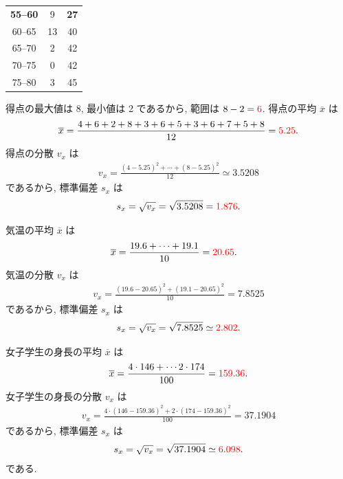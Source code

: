 \begin{qenumerate}
{\begin{table}[H]
\begin{tabular}{c|c|c}
				\textbf{55--60} &  9 & \textbf{27} \\
				60--65 & 13 & 40 \\
				65--70 &  2 & 42 \\
				70--75 &  0 & 42 \\
				75--80 &  3 & 45 \\ \hline
			\end{tabular}
		\end{table}
	}
	\item{
		得点の最大値は 8, 最小値は 2 であるから, 範囲は $8 - 2 = \textcolor{red}{6}$.
		得点の平均 $\overline{x}$ は
		\begin{align}
			\overline{x} = \frac{4 + 6 + 2 + 8 + 3 + 6 + 5 + 3 + 6 + 7 + 5 + 8}{12} = \textcolor{red}{5.25}.
		\end{align}
		得点の分散 $v_{x}$ は
		\begin{align}
			v_{x} = \frac{(4 - 5.25)^{2} + \cdots + (8 - 5.25)^{2}}{12} \simeq 3.5208
		\end{align}
		であるから, 標準偏差 $s_{x}$ は
		\begin{align}
			s_{x} = \sqrt{v_{x}} = \sqrt{3.5208} = \textcolor{red}{1.876}.
		\end{align}
	}
	\item{
		気温の平均 $\overline{x}$ は
		\begin{align}
			\overline{x} &= \frac{19.6 + \cdots + 19.1}{10} = \textcolor{red}{20.65}.
		\end{align}
		気温の分散 $v_{x}$ は
		\begin{align}
			v_{x} = \frac{(19.6 - 20.65)^{2} + (19.1 - 20.65)^{2}}{10} = 7.8525
		\end{align}
		であるから, 標準偏差 $s_{x}$ は
		\begin{align}
			s_{x} = \sqrt{v_{x}} = \sqrt{7.8525} \simeq \textcolor{red}{2.802}.
		\end{align}
	}
	\item{
		女子学生の身長の平均 $\overline{x}$ は
		\begin{align}
			\overline{x} = \frac{4\cdot 146 + \cdots 2\cdot 174}{100} = \textcolor{red}{159.36}.
		\end{align}
		女子学生の身長の分散 $v_{x}$ は
		\begin{align}
			v_{x} = \frac{4\cdot (146 - 159.36)^{2} + 2\cdot (174 - 159.36)^{2}}{100} = 37.1904
		\end{align}
		であるから, 標準偏差 $s_{x}$ は
		\begin{align}
			s_{x} = \sqrt{v_{x}} = \sqrt{37.1904} \simeq \textcolor{red}{6.098}.
		\end{align}
		である.
	}
\end{qenumerate}

